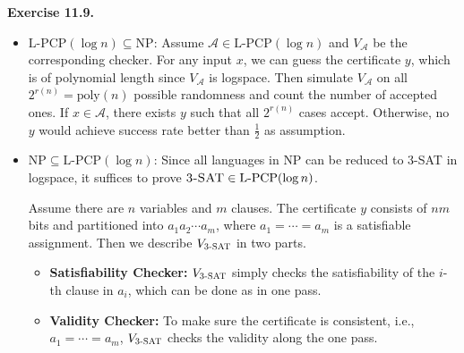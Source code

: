 \documentclass[a4paper]{article}
\newenvironment{exercise}[1]{
	\par
	\noindent\textbf{Exercise #1.}\quad
}{
	\par
	\bigskip
}
\begin{document}
    \begin{exercise}{11.9} $ $
        \begin{itemize}
            \item $\text{L-PCP}(\log n)\subseteq\text{NP}$:
                Assume $\mathcal A\in\text{L-PCP}(\log n)$ and $V_{\mathcal A}$ be the corresponding checker.
                For any input $x$, we can guess the certificate $y$, 
                which is of polynomial length since $V_{\mathcal A}$ is logspace.
                Then simulate $V_{\mathcal A}$ on all $2^{r(n)}=\text{poly}(n)$ possible randomness and count the number of accepted
                ones.
                If $x\in\mathcal A$, there exists $y$ such that all $2^{r(n)}$ cases accept.
                Otherwise, no $y$ would achieve success rate better than $\frac12$ as assumption.
            \item $\text{NP}\subseteq\text{L-PCP}(\log n)$:
                Since all languages in $\text{NP}$ can be reduced to \textsc{3-SAT} in logspace, it suffices to prove 
                $\textsc{3-SAT}\in\text{L-PCP}(\log n)$.

                Assume there are $n$ variables and $m$ clauses. The certificate $y$ consists of $nm$ bits and partitioned into
                $a_1a_2\cdots a_m$, where $a_1=\cdots=a_m$ is a satisfiable assignment.
                Then we describe $V_\textsc{3-SAT}$ in two parts.
                \begin{itemize}
                    \item \textbf{Satisfiability Checker:}
                        $V_\textsc{3-SAT}$ simply checks the satisfiability of the $i$-th clause in $a_i$, which can be done
                        as in one pass.
                    \item \textbf{Validity Checker:}
                        To make sure the certificate is consistent, i.e., $a_1=\cdots=a_m$, $V_\textsc{3-SAT}$ checks the validity
                        along the one pass.


\end{itemize}
\end{itemize}
\end{exercise}
\end{document}
